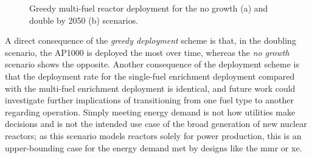 \begin{figure}[H]
    \hfill
    \caption{Greedy multi-fuel reactor deployment for the no growth (a) and double by 2050 (b) scenarios.}
    \label{fig:greedy_mf_reactors}
\end{figure}

A direct consequence of the \textit{greedy deployment} scheme is that, in the doubling scenario, the AP1000 is deployed the most over time, whereas the \textit{no growth} scenario shows the opposite. Another consequence of the deployment scheme is that the deployment rate for the single-fuel enrichment deployment compared with the multi-fuel enrichment deployment is identical, and future work could investigate further implications of transitioning from one fuel type to another regarding operation. Simply meeting energy demand is not how utilities make decisions and is not the intended use case of the broad generation of new nuclear reactors; as this scenario models reactors solely for power production, this is an upper-bounding case for the energy demand met by designs like the \gls{mmr} or \gls{xe}.


